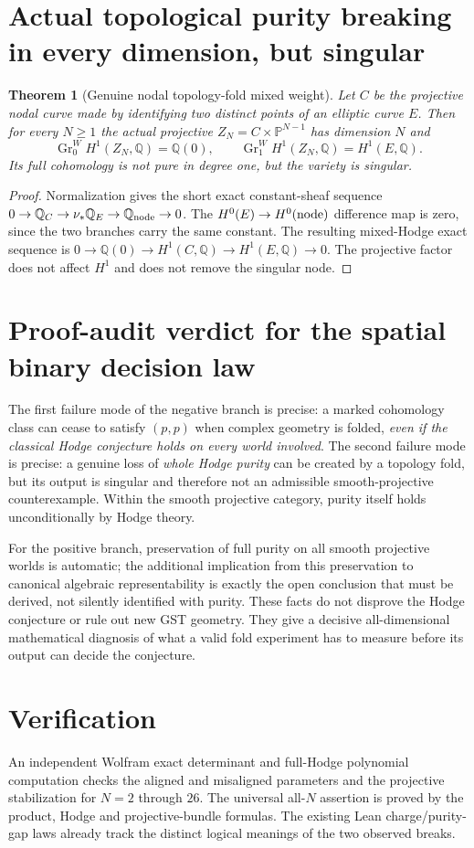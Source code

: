 \documentclass[11pt]{article}
\newtheorem{theorem}{Theorem}
\begin{document}
\section{Actual topological purity breaking in every dimension, but singular}
\begin{theorem}[Genuine nodal topology-fold mixed weight]
Let $C$ be the projective nodal curve made by identifying
two distinct points of an elliptic curve $E$.
Then for every $N\ge1$ the actual projective
$Z_N=C\times\mathbb P^{N-1}$ has dimension $N$
and
\[
 \boxed{\operatorname{Gr}^W_0H^1(Z_N,\mathbb Q)=\mathbb Q(0),
 \qquad\operatorname{Gr}^W_1H^1(Z_N,\mathbb Q)=H^1(E,\mathbb Q).}\tag{6}
\]
Its full cohomology is not pure in degree one,
but the variety is singular.
\end{theorem}
\begin{proof}
Normalization gives the short exact constant-sheaf
sequence
$0\to\mathbb Q_C\to\nu_*\mathbb Q_E\to\mathbb Q_{\rm node}\to0$.
The $H^0(E)\to H^0(\rm node)$ difference map is zero,
since the two branches carry the same constant.
The resulting mixed-Hodge exact sequence is
$0\to\mathbb Q(0)\to H^1(C,\mathbb Q)\to H^1(E,\mathbb Q)\to0$.
The projective factor does not affect $H^1$ and
does not remove the singular node.
\end{proof}

\section{Proof-audit verdict for the spatial binary decision law}
The first failure mode of the negative branch is precise:
a marked cohomology class can cease to satisfy $(p,p)$
when complex geometry is folded, \emph{even if the classical
Hodge conjecture holds on every world involved}.
The second failure mode is precise:
a genuine loss of \emph{whole Hodge purity} can be
created by a topology fold, but its output is singular
and therefore not an admissible smooth-projective
counterexample. Within the smooth projective category,
purity itself holds unconditionally by Hodge theory.

For the positive branch, preservation of full purity
on all smooth projective worlds is automatic; the
additional implication from this preservation to
canonical algebraic representability is exactly the
open conclusion that must be derived, not silently
identified with purity. These facts do not disprove
the Hodge conjecture or rule out new GST geometry.
They give a decisive all-dimensional mathematical
diagnosis of what a valid fold experiment has to
measure before its output can decide the conjecture.

\section{Verification}
An independent Wolfram exact determinant and full-Hodge
polynomial computation checks the aligned and misaligned
parameters and the projective stabilization for $N=2$
through $26$. The universal all-$N$ assertion is proved
by the product, Hodge and projective-bundle formulas.
The existing Lean charge/purity-gap laws already track
the distinct logical meanings of the two observed breaks.
\end{document}
